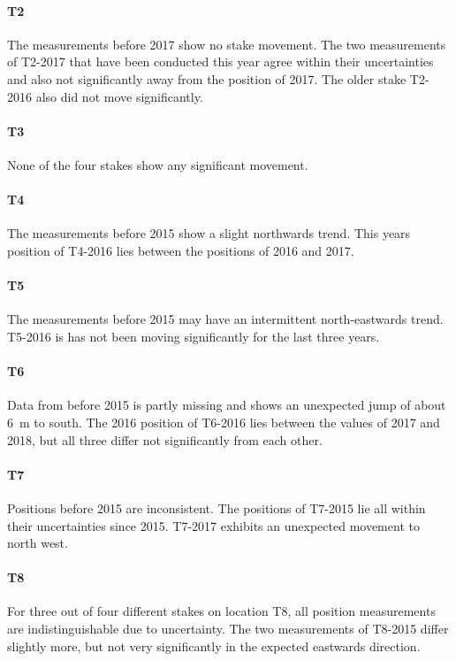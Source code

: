 \paragraph{T2}
The measurements before 2017 show no stake movement.
The two measurements of T2-2017 that have been conducted this year agree within their uncertainties and
also not significantly away from the position of 2017.
The older stake T2-2016 also did not move significantly.

\paragraph{T3}
None of the four stakes show any significant movement.

\paragraph{T4}
The measurements before 2015 show a slight northwards trend.
This years position of T4-2016 lies between the positions of 2016 and 2017.

\paragraph{T5}
The measurements before 2015 may have an intermittent north-eastwards trend.
T5-2016 is has not been moving significantly for the last three years.

\paragraph{T6}
Data from before 2015 is partly missing and shows an unexpected jump of about 6~m to south.
The 2016 position of T6-2016 lies between the values of 2017 and 2018,
but all three differ not significantly from each other.

\paragraph{T7}
Positions before 2015 are inconsistent.
The positions of T7-2015 lie all within their uncertainties since 2015.
T7-2017 exhibits an unexpected movement to north west.

\paragraph{T8}
For three out of four different stakes on location T8, all position measurements are indistinguishable due to uncertainty.
The two measurements of T8-2015 differ slightly more, but not very significantly in the expected eastwards direction.
\bigskip

